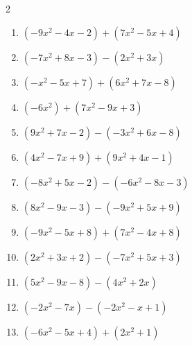 \begin{multicols}{2}
\begin{enumerate}

  \item $(-9x^{2}-4x-2)+(7x^{2}-5x+4)$


  \item $(-7x^{2}+8x-3)-(2x^{2}+3x)$


  \item $(-x^{2}-5x+7)+(6x^{2}+7x-8)$


  \item $(-6x^{2})+(7x^{2}-9x+3)$


\columnbreak %

\resetques

  \item $(9x^{2}+7x-2)-(-3x^{2}+6x-8)$


  \item $(4x^{2}-7x+9)+(9x^{2}+4x-1)$


  \item $(-8x^{2}+5x-2)-(-6x^{2}-8x-3)$


  \item $(8x^{2}-9x-3)-(-9x^{2}+5x+9)$


  \item $(-9x^{2}-5x+8)+(7x^{2}-4x+8)$


  \item $(2x^{2}+3x+2)-(-7x^{2}+5x+3)$


  \item $(5x^{2}-9x-8)-(4x^{2}+2x)$


  \item $(-2x^{2}-7x)-(-2x^{2}-x+1)$

        \phantom{$=-6x-1$}

  \item $(-6x^{2}-5x+4)+(2x^{2}+1)$


\end{enumerate}
\end{multicols}
